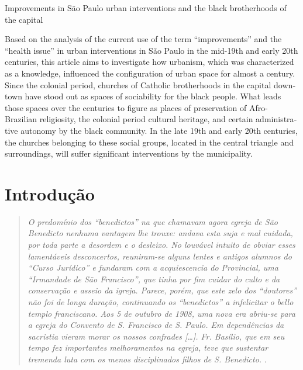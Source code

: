 \begin{refsection}
\begin{otherlanguage}{english}
    \fakeChapterTwoLines
    {Improvements in São Paulo}
    {urban interventions and the black brotherhoods of the capital}

    \begin{galoResumo}[Abstract]
        Based on the analysis of the current use of the term ``improvements'' and the ``health issue'' in urban interventions in São Paulo in the mid-19th and early 20th centuries, this article aims to investigate how urbanism, which was characterized as a knowledge, influenced the configuration of urban space for almost a century. Since the colonial period, churches of Catholic brotherhoods in the capital downtown have stood out as spaces of sociability for the black people. What leads those spaces over the centuries to figure as places of preservation of Afro-Brazilian religiosity, the colonial period cultural heritage, and certain administrative autonomy by the black community. In the late 19th and early 20th centuries, the churches belonging to these social groups, located in the central triangle and surroundings, will suffer significant interventions by the municipality.
    \end{galoResumo}
    \mednobreak
    \end{otherlanguage}

    \section{Introdução}

    \begin{quotation}
        \textit{O predomínio dos ``benedictos'' na que chamavam agora egreja de São Benedicto nenhuma vantagem lhe trouxe: andava esta suja e mal cuidada, por toda parte a desordem e o desleixo. No louvável intuito de obviar esses lamentáveis desconcertos, reuniram-se alguns lentes e antigos alumnos do ``Curso Jurídico'' e fundaram com a acquiescencia do Provincial, uma ``Irmandade de São Francisco'', que tinha por fim cuidar do culto e da conservação e asseio da igreja. Parece, porém, que este zelo dos ``doutores'' não foi de longa duração, continuando os ``benedictos'' a infelicitar o bello templo franciscano. Aos 5 de outubro de 1908, uma nova era abriu-se para a egreja do Convento de S. Francisco de S. Paulo. Em dependências da sacristia vieram morar os nossos confrades [\dots]. Fr. Basílio, que em seu tempo fez importantes melhoramentos na egreja, teve que sustentar tremenda luta com os menos disciplinados filhos de S. Benedicto.} \cite[p.~82]{Rower1922Provincia}.
    \end{quotation}


\end{refsection}
